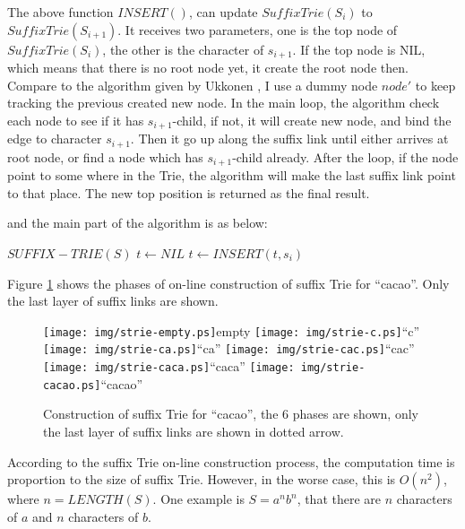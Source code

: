 \documentclass{article}
\begin{document}
The above function $INSERT()$, can update $SuffixTrie(S_i)$ to $SuffixTrie(S_{i+1})$.
It receives two parameters, one is the top node of $SuffixTrie(S_i)$, the other
is the character of $s_{i+1}$. If the top node is NIL, which means that there is
no root node yet, it create the root node then. Compare to the algorithm given
by Ukkonen \cite{ukkonen95}, I use a dummy node $node'$ to keep tracking the 
previous created new node. In the main loop, the algorithm check each node
to see if it has $s_{i+1}$-child, if not, it will create new node, and bind the 
edge to character $s_{i+1}$. Then it go up along the suffix link until either
arrives at root node, or find a node which has $s_{i+1}$-child already. After
the loop, if the node point to some where in the Trie, the algorithm will 
make the last suffix link point to that place. The new top position is returned
as the final result.

and the main part of the algorithm is as below:
\begin{algorithmic}
\STATE $SUFFIX-TRIE(S)$
  \STATE $t \leftarrow NIL$
    \STATE $t \leftarrow INSERT(t, s_i)$
  \ENDFOR
\end{algorithmic}

Figure \ref{fig:cons-strie-cacao} shows the phases of on-line construction
of suffix Trie for ``cacao''. Only the last layer of suffix links are shown.

\begin{figure}[htbp]
   \begin{center}
     \texttt{[image: img/strie-empty.ps]}empty
     \texttt{[image: img/strie-c.ps]}``c''
     \texttt{[image: img/strie-ca.ps]}``ca''
     \texttt{[image: img/strie-cac.ps]}``cac'' \newline
     \texttt{[image: img/strie-caca.ps]}``caca''
     \texttt{[image: img/strie-cacao.ps]}``cacao''
     \caption{Construction of suffix Trie for ``cacao'', the 6 phases are shown, only the last layer of suffix links are shown in dotted arrow.}
     \label{fig:cons-strie-cacao}
   \end{center}
\end{figure}

According to the suffix Trie on-line construction process, the computation time
is proportion to the size of suffix Trie. However, in the worse case, this is 
$O(n^2)$, where $n=LENGTH(S)$. One example is $S=a^nb^n$, that there are $n$ 
characters of $a$ and $n$ characters of $b$.
\end{document}
